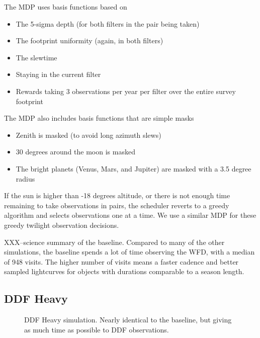 The MDP uses basis functions based on
\begin{itemize}
    \item{The 5-sigma depth (for both filters in the pair being taken)}
    \item{The footprint uniformity (again, in both filters)}
    \item{The slewtime}
    \item{Staying in the current filter}
    \item{Rewards taking 3 observations per year per filter over the entire survey footprint} 
\end{itemize}
The MDP also includes basis functions that are simple masks
\begin{itemize}
    \item{Zenith is masked (to avoid long azimuth slews)}
    \item{30 degrees around the moon is masked}
    \item{The bright planets (Venus, Mars, and Jupiter) are masked with a 3.5 degree radius}
\end{itemize}


If the sun is higher than -18 degrees altitude, or there is not enough time remaining to take observations in pairs, the scheduler reverts to a greedy algorithm and selects observations one at a time. We use a similar MDP for these greedy twilight observation decisions. 


XXX--science summary of the baseline.  Compared to many of the other simulations, the baseline spends a lot of time observing the WFD, with a median of 948 visits. The higher number of visits means a faster cadence and better sampled lightcurves for objects with durations comparable to a season length.

\subsection{DDF Heavy}

\begin{figure}
\caption{DDF Heavy simulation. Nearly identical to the baseline, but giving as much time as possible to DDF observations.}\label{fig:ddfheavy}
\end{figure}


